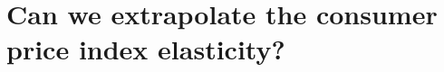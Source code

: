 \documentclass[11pt,a4paper]{article}
\begin{document}
%
%
%
%
%

\section{Can we extrapolate the consumer price index elasticity?}
\label{sec:extrapo}
\end{document}
